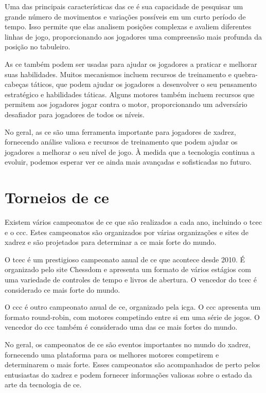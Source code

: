 \documentclass{report}
\begin{document}
Uma das principais características das \ac{ce} é sua capacidade de pesquisar um grande número de movimentos e variações possíveis em um curto período de tempo. Isso permite que elas analisem posições complexas e avaliem diferentes linhas de jogo, proporcionando aos jogadores uma compreensão mais profunda da posição no tabuleiro.

As \ac{ce} também podem ser usadas para ajudar os jogadores a praticar e melhorar suas habilidades. Muitos mecanismos incluem recursos de treinamento e quebra-cabeças táticos, que podem ajudar os jogadores a desenvolver o seu pensamento estratégico e habilidades táticas. Alguns motores também incluem recursos que permitem aos jogadores jogar contra o motor, proporcionando um adversário desafiador para jogadores de todos os níveis.

No geral, as \ac{ce} são uma ferramenta importante para jogadores de xadrez, fornecendo análise valiosa e recursos de treinamento que podem ajudar os jogadores a melhorar o seu nível de jogo. À medida que a tecnologia continua a evoluir, podemos esperar ver \ac{ce} ainda mais avançadas e sofisticadas no futuro.

\section{Torneios de \ac{ce}}

Existem vários campeonatos de \ac{ce} que são realizados a cada ano, incluindo o \ac{tcec} e o \ac{ccc}. Estes campeonatos são organizados por várias organizações e sites de xadrez e são projetados para determinar a \ac{ce} mais forte do mundo.

O \ac{tcec} é um prestigioso campeonato anual de \ac{ce} que acontece desde 2010. É organizado pelo site Chessdom e apresenta um formato de vários estágios com uma variedade de controles de tempo e livros de abertura. O vencedor do \ac{tcec} é considerado \ac{ce} mais forte do mundo.

O \ac{ccc} é outro campeonato anual de \ac{ce}, organizado pela \ac{icga}. O \ac{ccc} apresenta um formato round-robin, com motores competindo entre si em uma série de jogos. O vencedor do \ac{ccc} também é considerado uma das \ac{ce} mais fortes do mundo.

No geral, os campeonatos de \ac{ce} são eventos importantes no mundo do xadrez, fornecendo uma plataforma para os melhores motores competirem e determinarem o mais forte. Esses campeonatos são acompanhados de perto pelos entusiastas do xadrez e podem fornecer informações valiosas sobre o estado da arte da tecnologia de \ac{ce}.
\end{document}
